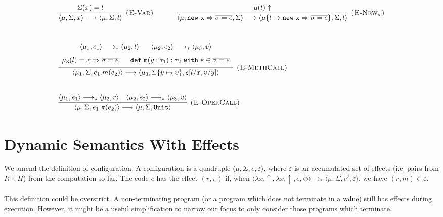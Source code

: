 \documentclass{llncs}
\newcommand{\keywadj}[1]{\mathtt{#1}}
\newcommand{\keyw}[1]{\keywadj{#1}~}
\newcommand{\config}[1] { \langle #1 \rangle }
\begin{document}
\[
\begin{array}{lll}
\begin{array}{lllr}
	\infer[\textsc{(E-Var)}]
		{\config{\mu, \Sigma, x} \longrightarrow \config{\mu, \Sigma, l}}
		{\Sigma(x) = l}
~~~~~~~~~~
	\infer[\textsc{(E-New$_\sigma$)}]
		{\config{\mu, \keywadj{new~x} \Rightarrow \overline{\sigma = e}, \Sigma }
			\longrightarrow
		 \config{\mu\{ l \mapsto \keywadj{new~x} \Rightarrow \overline{\sigma = e} \},  \Sigma, l }}
		{\mu(l) \uparrow} \\[5ex]
		
	\infer[\textsc{(E-MethCall)}]
		{\config{\mu_1, \Sigma, e_1.m(e_2)}
			\longrightarrow
		 \config{\mu_3, \Sigma\{ y \mapsto v \}, e[l/x, v/y]}}
  		{\def\arraystretch{1.6}
  			\begin{array}{c}
  				\config{\mu_1, e_1} \longrightarrow_* \config{\mu_2, l} ~~~~~
  		        	\config{\mu_2, e_2} \longrightarrow_* \config{\mu_3, v} \\
  		        \mu_3(l) = x \Rightarrow \overline{\sigma = e} ~~~~~
			    \keywadj{def~m}(y: \tau_1) : \tau_2~\keyw{with} \varepsilon \in \overline {\sigma = e}
			\end{array} }\\[5ex]
			
	\infer[\textsc{(E-OperCall)}]
		{\config{\mu, \Sigma, e_1.\pi(e_2)}
			\longrightarrow
		\config{\mu, \Sigma, \keywadj{Unit}}}
		{\config{\mu_1, e_1} \longrightarrow_* \config{\mu_2, r} & \config{\mu_2, e_2} \longrightarrow_* \config{\mu_3, v} }
			
\end{array}
\end{array}
\]

\section{Dynamic Semantics With Effects}

We amend the definition of configuration. A configuration is a quadruple $\config{\mu, \Sigma, e, \varepsilon}$, where $\varepsilon$ is an accumulated set of effects (i.e. pairs from $R \times \Pi$) from the computation so far. The code $e$ has the effect $(r,\pi)$ if, when $\config{\lambda x . \uparrow, \lambda x . \uparrow, e, \varnothing} \longrightarrow_* \config{\mu, \Sigma, e', \varepsilon}$, we have $(r,m) \in \varepsilon$.
\\\\
This definition could be overstrict. A non-terminating program (or a program which does not terminate in a value) still has effects during execution. However, it might be a useful simplification to narrow our focus to only consider those programs which terminate.
\\
\end{document}
